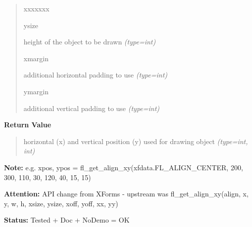 \begin{boxedminipage}{\funcwidth}
\begin{quote}
\begin{Ventry}{xxxxxxx}
          \item[ysize]


height of the object to be drawn
            {\it (type=int)}

          \item[xmargin]


additional horizontal padding to use
            {\it (type=int)}

          \item[ymargin]


additional vertical padding to use
            {\it (type=int)}

        \end{Ventry}

      \end{quote}

      \textbf{Return Value}
    \vspace{-1ex}

      \begin{quote}

horizontal (x) and vertical position (y) used for drawing object
      {\it (type=int, int)}

      \end{quote}

\textbf{Note:} 
e.g. xpos, ypos = fl\_get\_align\_xy(xfdata.FL\_ALIGN\_CENTER, 200, 300,
110, 30, 120, 40, 15, 15)


\textbf{Attention:} 
API change from XForms - upstream was
fl\_get\_align\_xy(align, x, y, w, h, xsize, ysize, xoff, yoff, xx, yy)


\textbf{Status:} 
Tested + Doc + NoDemo = OK


    \end{boxedminipage}

    \label{xformslib:flbasic:fl_drw_text}

    \vspace{0.5ex}

